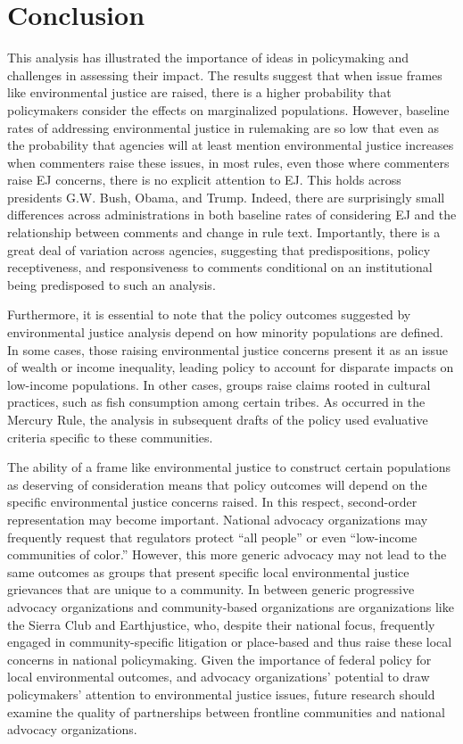 \documentclass[
      12pt,
        ]{article}
\begin{document}
\hypertarget{conclusion}{%
\section{Conclusion}\label{conclusion}}

This analysis has illustrated the importance of ideas in policymaking and challenges in assessing their impact. The results suggest that when issue frames
like environmental justice are raised, there is a higher probability that
policymakers consider the effects on marginalized populations. However, baseline rates of addressing environmental justice in rulemaking are so low that even as the probability that agencies will at least mention environmental justice increases when commenters raise these issues, in most rules, even those where commenters raise EJ concerns, there is no explicit attention to EJ. This holds across presidents G.W. Bush, Obama, and Trump. Indeed, there are surprisingly small differences across administrations in both baseline rates of considering EJ and the relationship between comments and change in rule text.
Importantly, there is a great deal of variation across agencies, suggesting that predispositions, policy receptiveness, and responsiveness to comments conditional on an
institutional being predisposed to such an analysis.

Furthermore, it is essential to note that the policy outcomes suggested
by environmental justice analysis depend on how minority populations are
defined. In some cases, those raising environmental justice concerns
present it as an issue of wealth or income inequality, leading policy to
account for disparate impacts on low-income populations. In other cases,
groups raise claims rooted in cultural practices, such as fish
consumption among certain tribes. As occurred in the Mercury Rule, the
analysis in subsequent drafts of the policy used evaluative criteria
specific to these communities.

The ability of a frame like environmental justice to construct certain
populations as deserving of consideration means that policy outcomes
will depend on the specific environmental justice concerns raised. In
this respect, second-order representation may become important. National
advocacy organizations may frequently request that regulators protect
``all people'' or even ``low-income communities of color.'' However, this
more generic advocacy may not lead to the same outcomes as groups that
present specific local environmental justice grievances that are unique
to a community. In between generic progressive advocacy organizations
and community-based organizations are organizations like the Sierra Club and Earthjustice, who, despite their national focus, frequently engaged in
community-specific litigation or place-based and thus raise these local concerns in
national policymaking. Given the importance of federal policy for local environmental outcomes, and advocacy organizations' potential to draw policymakers' attention to environmental justice issues, future research should examine the quality of partnerships between frontline communities and national advocacy organizations.
\end{document}
